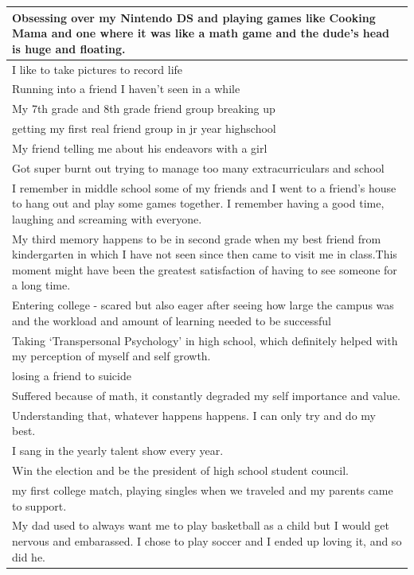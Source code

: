 \documentclass[
  .7em,
  letterpaper,
  DIV=11,
  numbers=noendperiod]{scrartcl}
\begin{document}
\begin{table}
\begin{tabular}{l}
\hline
Obsessing over my Nintendo DS and playing games like Cooking Mama and one where it was like a math game and the dude's head is huge and floating.\\
\hline
I like to take pictures to record life\\
\hline
Running into a friend I haven't seen in a while\\
\hline
My 7th grade and 8th grade friend group breaking up\\
\hline
getting my first real friend group in jr year highschool\\
\hline
My friend telling me about his endeavors with a girl\\
\hline
Got super burnt out trying to manage too many extracurriculars and school\\
\hline
I remember in middle school some of my friends and I went to a friend’s house to hang out and play some games together. I remember having a good time, laughing and screaming with everyone.\\
\hline
My third memory happens to be in second grade when my best friend from kindergarten in which I have not seen since then came to visit me in class.This moment might have been the greatest satisfaction of having to see someone for a long time.\\
\hline
Entering college - scared but also eager after seeing how large the campus was and the workload and amount of learning needed to be successful\\
\hline
Taking ‘Transpersonal Psychology’ in high school, which definitely helped with my perception of myself and self growth.\\
\hline
losing a friend to suicide\\
\hline
Suffered because of math, it constantly degraded my self importance and value.\\
\hline
Understanding that, whatever happens happens. I can only try and do my best.\\
\hline
I sang in the yearly talent show every year.\\
\hline
Win the election and be the president of high school student council.\\
\hline
my first college match, playing singles when we traveled and my parents came to support.\\
\hline
My dad used to always want me to play basketball as a child but I would get nervous and embarassed. I chose to play soccer and I ended up loving it, and so did he.\\
\hline

\end{tabular}
\end{table}
\end{document}
